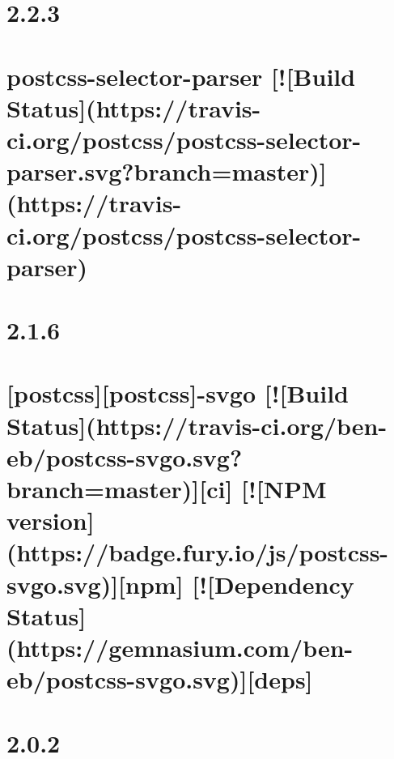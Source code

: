 \documentclass[twoside]{book}
\newcommand{\+}{\discretionary{\mbox{\scriptsize$\hookleftarrow$}}{}{}}
\begin{document}
\chapter{2.2.3}
\label{md__c_1_workspace_demo_src_main_script_node_modules_postcss-selector-parser__c_h_a_n_g_e_l_o_g}

\chapter{postcss-\/selector-\/parser \mbox{[}!\mbox{[}Build Status\mbox{]}(https\+://travis-\/ci.org/postcss/postcss-\/selector-\/parser.svg?branch=master)\mbox{]}(https\+://travis-\/ci.org/postcss/postcss-\/selector-\/parser)}
\label{md__c_1_workspace_demo_src_main_script_node_modules_postcss-selector-parser__r_e_a_d_m_e}

\chapter{2.1.6}
\label{md__c_1_workspace_demo_src_main_script_node_modules_postcss-svgo__c_h_a_n_g_e_l_o_g}

\chapter{\mbox{[}postcss\mbox{]}\mbox{[}postcss\mbox{]}-\/svgo \mbox{[}!\mbox{[}Build Status\mbox{]}(https\+://travis-\/ci.org/ben-\/eb/postcss-\/svgo.svg?branch=master)\mbox{]}\mbox{[}ci\mbox{]} \mbox{[}!\mbox{[}N\+PM version\mbox{]}(https\+://badge.fury.\+io/js/postcss-\/svgo.svg)\mbox{]}\mbox{[}npm\mbox{]} \mbox{[}!\mbox{[}Dependency Status\mbox{]}(https\+://gemnasium.com/ben-\/eb/postcss-\/svgo.svg)\mbox{]}\mbox{[}deps\mbox{]}}
\label{md__c_1_workspace_demo_src_main_script_node_modules_postcss-svgo__r_e_a_d_m_e}

\chapter{2.0.2}
\label{md__c_1_workspace_demo_src_main_script_node_modules_postcss-unique-selectors__c_h_a_n_g_e_l_o_g}

\end{document}
